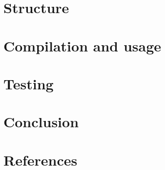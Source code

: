 \documentclass[a4paper]{article}
\begin{document}
\pagebreak

\section{Structure}



\pagebreak

\section{Compilation and usage}



\pagebreak

\section{Testing}



\pagebreak

\section{Conclusion}



\pagebreak

\listoffigures

\pagebreak

\section*{References}

\nocite{*}

\printbibliography[type=online, heading=subbibliography, title=Sitography]
\end{document}

